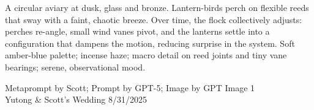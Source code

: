 \documentclass[12pt]{article}
\begin{document}
\noindent
\begin{adjustbox}{max size={\textwidth}{\textheight}}
\begin{varwidth}{\textwidth}
\RaggedRight
\footnotesize
A circular aviary at dusk, glass and bronze. Lantern-birds perch on flexible reeds that sway with a faint, chaotic breeze. Over time, the flock collectively adjusts: perches re-angle, small wind vanes pivot, and the lanterns settle into a configuration that dampens the motion, reducing surprise in the system. Soft amber-blue palette; incense haze; macro detail on reed joints and tiny vane bearings; serene, observational mood.
\end{varwidth}
\end{adjustbox}
\vfill
{\raggedleft\footnotesize
Metaprompt by Scott; Prompt by GPT-5; Image by GPT Image 1 \\
Yutong \& Scott's Wedding 8/31/2025\par}
\end{document}
